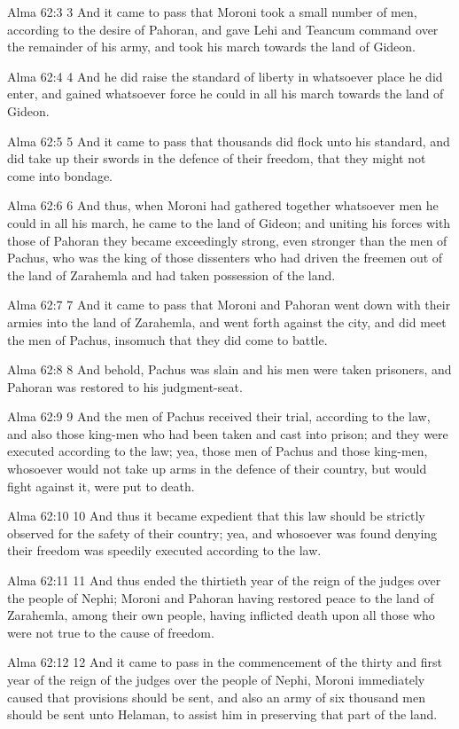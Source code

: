 Alma 62:3
 3 And it came to pass that Moroni took a small number of men,
according to the desire of Pahoran, and gave Lehi and Teancum
command over the remainder of his army, and took his march
towards the land of Gideon.

Alma 62:4
 4 And he did raise the standard of liberty in whatsoever place
he did enter, and gained whatsoever force he could in all his
march towards the land of Gideon.

Alma 62:5
 5 And it came to pass that thousands did flock unto his
standard, and did take up their swords in the defence of their
freedom, that they might not come into bondage.

Alma 62:6
 6 And thus, when Moroni had gathered together whatsoever men he
could in all his march, he came to the land of Gideon; and
uniting his forces with those of Pahoran they became exceedingly
strong, even stronger than the men of Pachus, who was the king of
those dissenters who had driven the freemen out of the land of
Zarahemla and had taken possession of the land.

Alma 62:7
 7 And it came to pass that Moroni and Pahoran went down with
their armies into the land of Zarahemla, and went forth against
the city, and did meet the men of Pachus, insomuch that they did
come to battle.

Alma 62:8
 8 And behold, Pachus was slain and his men were taken prisoners,
and Pahoran was restored to his judgment-seat.

Alma 62:9
 9 And the men of Pachus received their trial, according to the
law, and also those king-men who had been taken and cast into
prison; and they were executed according to the law; yea, those
men of Pachus and those king-men, whosoever would not take up
arms in the defence of their country, but would fight against it,
were put to death.

Alma 62:10
 10 And thus it became expedient that this law should be strictly
observed for the safety of their country; yea, and whosoever was
found denying their freedom was speedily executed according to
the law.

Alma 62:11
 11 And thus ended the thirtieth year of the reign of the judges
over the people of Nephi; Moroni and Pahoran having restored
peace to the land of Zarahemla, among their own people, having
inflicted death upon all those who were not true to the cause of
freedom.

Alma 62:12
 12 And it came to pass in the commencement of the thirty and
first year of the reign of the judges over the people of Nephi,
Moroni immediately caused that provisions should be sent, and
also an army of six thousand men should be sent unto Helaman, to
assist him in preserving that part of the land.

